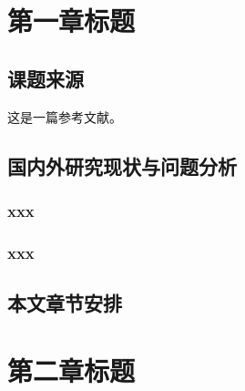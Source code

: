 \documentclass[UTF8,fontset=fandol]{ctexart}
\numberwithin{equation}{section} %
\numberwithin{table}{section} %
\begin{document}
\linespread{1.6} \selectfont  %


\setcounter{page}{7}  %

{\hypersetup{linkcolor=black}
\tableofcontents}
\pagebreak
{\hypersetup{linkcolor=black}
\renewcommand\listfigurename{图\;目\;录}
\listoffigures}
\pagebreak
{\hypersetup{linkcolor=black}
\renewcommand\listtablename{表\;目\;录}
\listoftables}

\pagebreak
\section{第一章标题}
\setcounter{page}{1}

\subsection{课题来源}
这是一篇参考文献\cite{zheng2013personalized}。
\subsection{国内外研究现状与问题分析}

\subsubsection{xxx}

\subsubsection{xxx}

\subsection{本文章节安排}

\newpage

\section{第二章标题}
\end{document}
